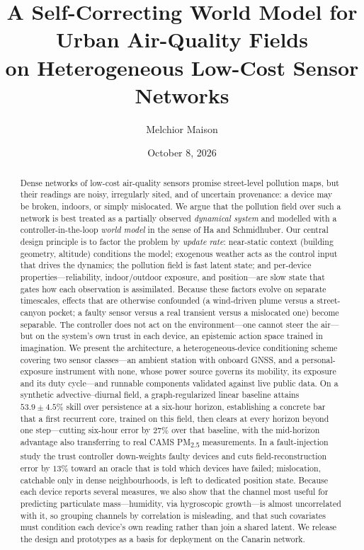 \documentclass[10pt]{article}
\title{\bfseries A Self-Correcting World Model for Urban Air-Quality Fields\\[2pt]
on Heterogeneous Low-Cost Sensor Networks}
\author[1]{Melchior Maison}
\affil[1]{\small Canarin Project, Paris, France \quad\texttt{\{firstname.lastname\}@canarin.example}}
\date{October 8, 2026}
\begin{document}
\maketitle

\begin{abstract}
\noindent
Dense networks of low-cost air-quality sensors promise street-level pollution
maps, but their readings are noisy, irregularly sited, and of uncertain
provenance: a device may be broken, indoors, or simply mislocated. We argue that
the pollution field over such a network is best treated as a partially observed
\emph{dynamical system} and modelled with a controller-in-the-loop
\emph{world model} in the sense of Ha and Schmidhuber. Our central design
principle is to factor the problem by \emph{update rate}: near-static context
(building geometry, altitude) conditions the model; exogenous weather acts as the
control input that drives the dynamics; the pollution field is fast latent state;
and per-device properties---reliability, indoor/outdoor exposure, and
position---are slow state that gates how each observation is assimilated. Because
these factors evolve on separate timescales, effects that are otherwise
confounded (a wind-driven plume versus a street-canyon pocket; a faulty sensor
versus a real transient versus a mislocated one) become separable. The controller
does not act on the environment---one cannot steer the air---but on the system's
own trust in each device, an epistemic action space trained in imagination. We
present the architecture, a heterogeneous-device conditioning scheme covering two
sensor classes---an ambient station with onboard GNSS, and a personal-exposure
instrument with none, whose power source governs its mobility, its exposure and
its duty cycle---and runnable components validated against live public data. On a synthetic advective--diurnal
field, a graph-regularized linear baseline attains $53.9\pm4.5\%$ skill over
persistence at a six-hour horizon, establishing a concrete bar that a first
recurrent core, trained on this field, then clears at every horizon beyond one
step---cutting six-hour error by $27\%$ over that baseline, with the mid-horizon
advantage also transferring to real CAMS PM\textsubscript{2.5} measurements. In a
fault-injection study the trust controller down-weights
faulty devices and cuts field-reconstruction error by $13\%$ toward an oracle that
is told which devices have failed; mislocation, catchable only in dense
neighbourhoods, is left to dedicated position state. Because each device reports several
measures, we also show that the channel most useful for predicting
particulate mass---humidity, via hygroscopic growth---is almost uncorrelated with
it, so grouping channels by correlation is misleading, and that such covariates
must condition each device's own reading rather than join a shared latent. We release the
design and prototypes as a basis for deployment
on the Canarin network.
\end{abstract}
\end{document}

